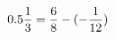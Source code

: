 \documentclass[preview]{standalone}
\begin{document}
\begin{align*}
\special{dvisvgm:raw <g id='unique000'>}0.5 \frac{1}{3} = \frac{6}{8} - (- \frac{1}{12})\special{dvisvgm:raw </g>}
\end{align*}
\end{document}
